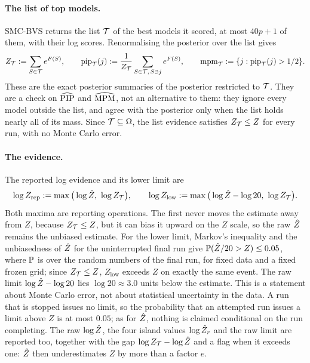 \paragraph{The list of top models.} SMC-BVS returns the list $\Tlist$ of the best models it scored, at most $40p+1$
of them, with their log scores. Renormalising the posterior over the list gives
\begin{equation}\label{eq:list}
  \Zlist:=\sum_{S\in\Tlist}e^{F(S)},\qquad
  \piplist(j):=\frac{1}{\Zlist}\sum_{S\in\Tlist,\,S\ni j}e^{F(S)},\qquad
  \mpmlist:=\{j:\piplist(j)>1/2\}.
\end{equation}
These are the exact posterior summaries of the posterior restricted to $\Tlist$. They are a check on $\PIPhat$ and
$\MPMhat$, not an alternative to them: they ignore every model outside the list, and agree with the posterior only
when the list holds nearly all of its mass. Since $\Tlist\subseteq\Om$, the list evidence satisfies $\Zlist\le Z$
for every run, with no Monte Carlo error.

\paragraph{The evidence.} The reported log evidence and its lower limit are
\begin{equation}\label{eq:evidence}
  \log Z_{\mathrm{rep}}:=\max\big(\log\Zhat,\ \log\Zlist\big),\qquad
  \log Z_{\mathrm{low}}:=\max\big(\log\Zhat-\log20,\ \log\Zlist\big).
\end{equation}
Both maxima are reporting operations. The first never moves the estimate away from $Z$, because $\Zlist\le Z$, but it
can bias it upward on the $Z$ scale, so the raw $\Zhat$ remains the unbiased estimate. For the lower limit, Markov's
inequality and the unbiasedness of $\Zhat$ for the uninterrupted final run give $\P(\Zhat/20>Z)\le0.05$, where $\P$
is over the random numbers of the final run, for fixed data and a fixed frozen grid; since $\Zlist\le Z$,
$Z_{\mathrm{low}}$ exceeds $Z$ on exactly the same event. The raw limit $\log\Zhat-\log20$ lies $\log20\approx3.0$
units below the estimate. This is a statement about Monte Carlo error, not about statistical uncertainty in the data.
A run that is stopped issues no limit, so the probability that an attempted run issues a limit above $Z$ is at most
$0.05$; as for $\Zhat$, nothing is claimed conditional on the run completing. The raw $\log\Zhat$, the four island values $\log\Zhat_r$ and the raw limit are reported
too, together with the gap $\log\Zlist-\log\Zhat$ and a flag when it exceeds one: $\Zhat$ then underestimates $Z$ by
more than a factor $e$.

